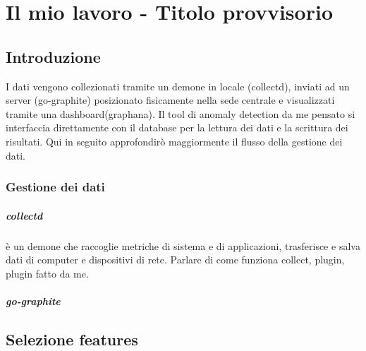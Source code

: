 \chapter{Il mio lavoro - Titolo provvisorio}

\section{Introduzione}

I dati vengono collezionati tramite un demone in locale (collectd), inviati ad un server (go-graphite) posizionato fisicamente nella sede centrale e visualizzati tramite una dashboard(graphana).
Il tool di anomaly detection da me pensato si interfaccia direttamente con il database per la lettura dei dati e la scrittura dei risultati.
Qui in seguito approfondirò maggiormente il flusso della gestione dei dati.
\subsection{Gestione dei dati}

\paragraph{collectd} è un demone che raccoglie metriche di sistema e di applicazioni, trasferisce e salva dati di computer e dispositivi di rete.
Parlare di come funziona collect, plugin, plugin fatto da me.

\paragraph{go-graphite}

\section{Selezione features}

